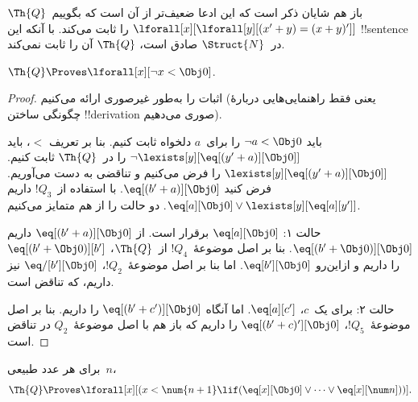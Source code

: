 \documentclass[../../../include/open-logic-section]{subfiles}
\begin{document}
باز هم شایان ذکر است که این ادعا ضعیف‌تر از آن است که بگوییم~$\Th{Q}$
$\lforall[x][\lforall[y][(x' + y) = (x + y)']]$ را ثابت می‌کند.
با آنکه این !!{sentence} در~$\Struct{N}$ صادق است، $\Th{Q}$ آن را ثابت
نمی‌کند.

\begin{lem}
$\Th{Q} \Proves \lforall[x][\lnot x < \Obj 0]$.
\end{lem}

\begin{proof}
اثبات را به‌طور غیرصوری ارائه می‌کنیم (یعنی فقط راهنمایی‌هایی دربارهٔ
چگونگی ساختن !!{derivation} صوری می‌دهیم).

باید $\lnot a < \Obj 0$ را برای~$a$ دلخواه ثابت کنیم. بنا بر تعریف
$<$، باید $\lnot \lexists[y][\eq[(y'+a)][\Obj 0]]$ را در~$\Th{Q}$
ثابت کنیم. $\lexists[y][\eq[(y'+a)][\Obj 0]]$ را فرض می‌کنیم و
تناقضی به دست می‌آوریم. فرض کنید $\eq[(b'+a)][\Obj 0]$. با استفاده
از~$!Q_3$ داریم $\eq[a][\Obj 0] \lor \lexists[y][\eq[a][y']]$.
دو حالت را از هم متمایز می‌کنیم.

حالت ۱: $\eq[a][\Obj 0]$ برقرار است. از $\eq[(b'+a)][\Obj 0]$ داریم
$\eq[(b' + \Obj 0)][\Obj 0]$. بنا بر اصل موضوعهٔ~$!Q_4$ از~$\Th{Q}$،
$\eq[(b' + \Obj 0)][b']$ را داریم و ازاین‌رو $\eq[b'][\Obj 0]$.
اما بنا بر اصل موضوعهٔ~$!Q_2$، $\eq/[b'][\Obj 0]$ نیز داریم، که
تناقض است.

حالت ۲: برای یک~$c$، $\eq[a][c']$. اما آنگاه
$\eq[(b' + c')][\Obj 0]$ را داریم. بنا بر اصل موضوعهٔ~$!Q_5$،
$\eq[(b' + c)'][\Obj 0]$ را داریم که باز هم با اصل موضوعهٔ~$Q_2$
در تناقض است.
\end{proof}

\begin{lem}
برای هر عدد طبیعی~$n$،
  \[
  \Th{Q} \Proves
  \lforall[x][(x < \num {n+1} \lif (\eq[x][\Obj 0] \lor \dots \lor
    \eq[x][\num n]))].
  \]
\end{lem}
\end{document}

